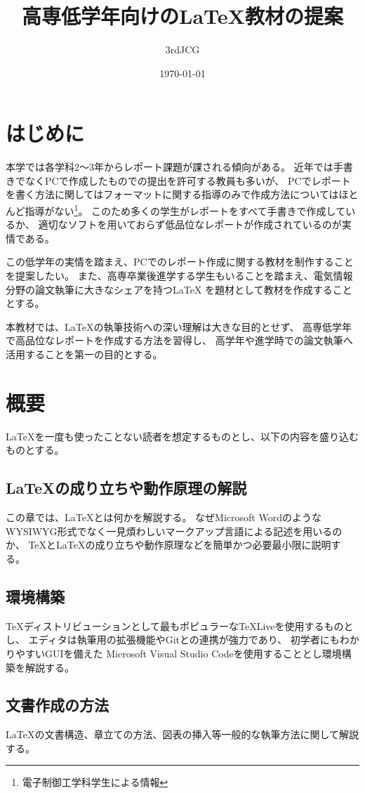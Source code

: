 \documentclass[uplatex]{jsarticle}
\title{高専低学年向けの\LaTeX 教材の提案}
\author{3rdJCG}
\date{\today}
\begin{document}
\maketitle

\section{はじめに}
	本学では各学科2～3年からレポート課題が課される傾向がある。
	近年では手書きでなくPCで作成したものでの提出を許可する教員も多いが、
	PCでレポートを書く方法に関してはフォーマットに関する指導のみで作成方法についてはほとんど指導がない\footnote{電子制御工学科学生による情報}。
	このため多くの学生がレポートをすべて手書きで作成しているか、
	適切なソフトを用いておらず低品位なレポートが作成されているのが実情である。

	この低学年の実情を踏まえ、PCでのレポート作成に関する教材を制作することを提案したい。
	また、高専卒業後進学する学生もいることを踏まえ、電気情報分野の論文執筆に大きなシェアを持つ\LaTeX
	を題材として教材を作成することとする。

	本教材では、\LaTeX の執筆技術への深い理解は大きな目的とせず、
	高専低学年で高品位なレポートを作成する方法を習得し、
	高学年や進学時での論文執筆へ活用することを第一の目的とする。

\section{概要}
	\LaTeX を一度も使ったことない読者を想定するものとし、以下の内容を盛り込むものとする。

	\subsection{\LaTeX の成り立ちや動作原理の解説}
		この章では、\LaTeX とは何かを解説する。
		なぜMicrosoft WordのようなWYSIWYG形式でなく一見煩わしいマークアップ言語による記述を用いるのか、
		\TeX と\LaTeX の成り立ちや動作原理などを簡単かつ必要最小限に説明する。

	\subsection{環境構築}
		\TeX ディストリビューションとして最もポピュラーな\TeX Liveを使用するものとし、
		エディタは執筆用の拡張機能やGitとの連携が強力であり、
		初学者にもわかりやすいGUIを備えた
		Microsoft Visual Studio Codeを使用することとし環境構築を解説する。

	\subsection{文書作成の方法}
		\LaTeX の文書構造、章立ての方法、図表の挿入等一般的な執筆方法に関して解説する。
\end{document}
